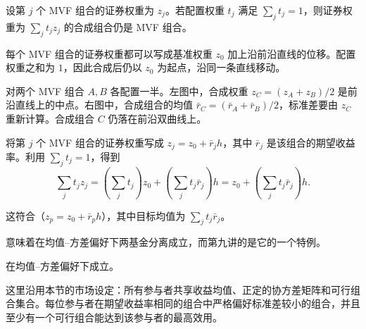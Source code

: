 \begin{tcolorbox}[knowledge]
 设第 $j$ 个 MVF 组合的证券权重为 $z_j$。若配置权重 $t_j$ 满足 $\sum_jt_j=1$，则证券权重为 $\sum_jt_jz_j$ 的合成组合仍是 MVF 组合。
\end{tcolorbox}

每个 MVF 组合的证券权重都可以写成基准权重 $z_0$ 加上沿前沿直线的位移。配置权重之和为 $1$，因此合成后仍以 $z_0$ 为起点，沿同一条直线移动。

 对两个 MVF 组合 $A,B$ 各配置一半。左图中，合成权重 $z_C=(z_A+z_B)/2$ 是前沿直线上的中点。右图中，合成组合的均值 $\bar r_C=(\bar r_A+\bar r_B)/2$，标准差要由 $z_C$ 重新计算。合成组合 $C$ 仍落在前沿双曲线上。

\begin{center}
\begin{minipage}{\linewidth}
\centering
\renewcommand{\thewjFigure}{\thechapter.S\arabic{wjFigure}}%
%
\par
{}
\end{minipage}
\end{center}

\begin{solution}[label-content={证明},blank-type=none]
将第 $j$ 个 MVF 组合的证券权重写成 $z_j=z_0+\bar r_jh$，其中 $\bar r_j$ 是该组合的期望收益率。利用 $\sum_jt_j=1$，得到
\[
 \sum_jt_jz_j=\left(\sum_jt_j\right)z_0+\left(\sum_jt_j\bar r_j\right)h
 =z_0+\left(\sum_jt_j\bar r_j\right)h.
\]

这符合（$z_p=z_0+\bar r_p h$），其中目标均值为 $\sum_jt_j\bar r_j$。
\end{solution}

意味着在均值--方差偏好下两基金分离成立，而第九讲的是它的一个特例。

\begin{tcolorbox}[knowledge]
 在均值--方差偏好下成立。

这里沿用本节的市场设定：所有参与者共享收益均值、正定的协方差矩阵和可行组合集合。每位参与者在期望收益率相同的组合中严格偏好标准差较小的组合，并且至少有一个可行组合能达到该参与者的最高效用。
\end{tcolorbox}

